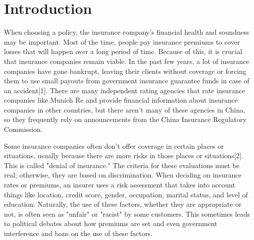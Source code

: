\documentclass[journal]{IEEEtran}
\begin{document}

\IEEEpeerreviewmaketitle

\section{Introduction}
When choosing a policy, the insurance company's financial health and soundness may be important. Most of the time, people pay insurance premiums to cover losses that will happen over a long period of time. Because of this, it is crucial that insurance companies remain viable. In the past few years, a lot of insurance companies have gone bankrupt, leaving their clients without coverage or forcing them to use small payouts from government insurance guarantee funds in case of an accident[1]. There are many independent rating agencies that rate insurance companies like Munich Re and provide financial information about insurance companies in other countries, but there aren't many of these agencies in China, so they frequently rely on announcements from the China Insurance Regulatory Commission.

\par Some insurance companies often don't offer coverage in certain places or situations, usually because there are more risks in those places or situations[2]. This is called "denial of insurance." The criteria for these evaluations must be real; otherwise, they are based on discrimination. When deciding on insurance rates or premiums, an insurer uses a risk assessment that takes into account things like location, credit score, gender, occupation, marital status, and level of education. Naturally, the use of these factors, whether they are appropriate or not, is often seen as "unfair" or "racist" by some customers. This sometimes leads to political debates about how premiums are set and even government interference and bans on the use of these factors.
\end{document}
